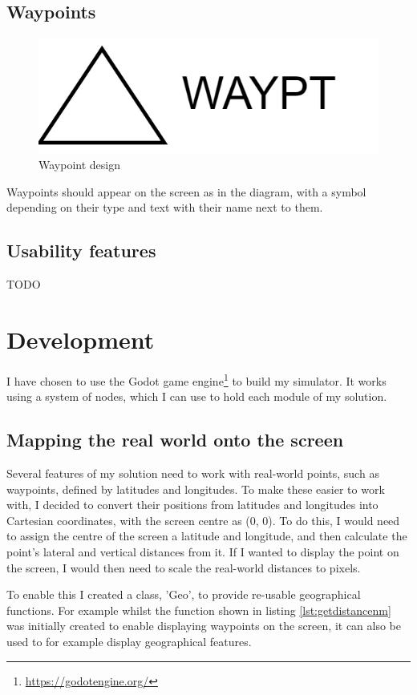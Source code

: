 \documentclass{article}
\begin{document}
\subsection{Waypoints}
\begin{figure}[H]
\centering
\includegraphics{diagrams/waypointdesign.png}
\caption{\label{fig:waypointdesign}Waypoint design}
\end{figure}
Waypoints should appear on the screen as in the diagram, with a symbol depending on their type and text with their name next to them.


\subsection{Usability features}
TODO


\clearpage
\section{Development}
I have chosen to use the Godot game engine\footnote{\url{https://godotengine.org/}} to build my simulator.
It works using a system of nodes, which I can use to hold each module of my solution.


\subsection{Mapping the real world onto the screen}
Several features of my solution need to work with real-world points, such as \glspl{waypoint}, defined by latitudes and longitudes.
To make these easier to work with, I decided to convert their positions from latitudes and longitudes into Cartesian coordinates, with the screen centre as (0, 0).
To do this, I would need to assign the centre of the screen a latitude and longitude, and then calculate the point's lateral and vertical distances from it.
If I wanted to display the point on the screen, I would then need to scale the real-world distances to pixels.

To enable this I created a class, 'Geo', to provide re-usable geographical functions.
For example whilst the function shown in listing \ref{lst:getdistancenm} was initially created to enable displaying waypoints on the screen, it can also be used to for example display geographical features.
\end{document}
